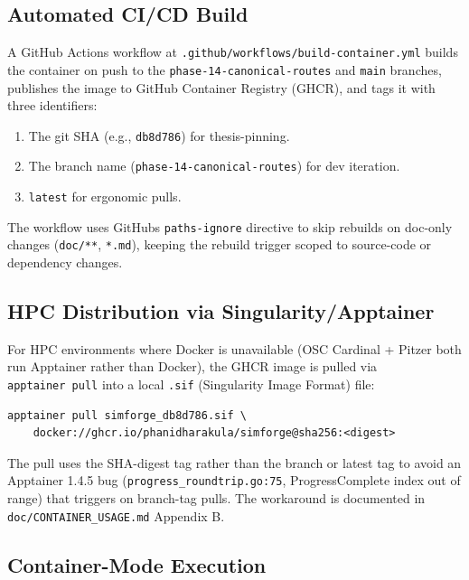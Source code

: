 \subsection{Automated CI/CD
Build}\label{3112-automated-cicd-build}

A GitHub Actions workflow at
\texttt{.github/workflows/build-container.yml} builds the container on
push to the \texttt{phase-14-canonical-routes} and \texttt{main}
branches, publishes the image to GitHub Container Registry (GHCR), and
tags it with three identifiers:

\begin{enumerate}
\def\labelenumi{\arabic{enumi}.}
\tightlist
\item
  The git SHA (e.g., \texttt{db8d786}) for thesis-pinning.
\item
  The branch name (\texttt{phase-14-canonical-routes}) for dev
  iteration.
\item
  \texttt{latest} for ergonomic pulls.
\end{enumerate}

The workflow uses GitHub\textquotesingle s \texttt{paths-ignore}
directive to skip rebuilds on doc-only changes (\texttt{doc/**},
\texttt{*.md}), keeping the rebuild trigger scoped to source-code or
dependency changes.

\subsection{HPC Distribution via
Singularity/Apptainer}\label{3113-hpc-distribution-via-singularityapptainer}

For HPC environments where Docker is unavailable (OSC Cardinal + Pitzer
both run Apptainer rather than Docker), the GHCR image is pulled via
\texttt{apptainer\ pull} into a local \texttt{.sif} (Singularity Image
Format) file:

\begin{verbatim}
apptainer pull simforge_db8d786.sif \
    docker://ghcr.io/phanidharakula/simforge@sha256:<digest>
\end{verbatim}

The pull uses the SHA-digest tag rather than the branch or latest tag to
avoid an Apptainer 1.4.5 bug (\texttt{progress\_roundtrip.go:75},
ProgressComplete index out of range) that triggers on branch-tag pulls.
The workaround is documented in \texttt{doc/CONTAINER\_USAGE.md}
Appendix B.

\subsection{Container-Mode
Execution}\label{3114-container-mode-execution}

